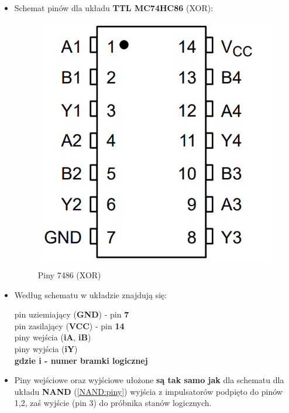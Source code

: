 \begin{itemize}
    \item Schemat pinów dla układu \textbf{TTL MC74HC86} (XOR):
        \begin{figure}[H]
            \centering
            \includegraphics[scale=0.25]{img/schemes/XOR_mc74hc86_pins.png}
            \caption{Piny 7486 (XOR)}
            \label{XOR:piny}
        \end{figure}
    \item Według schematu w układzie znajdują się: 
        \begin{center}
            pin uziemiający (\textbf{GND}) - pin \textbf{7} \\
            pin zasilający (\textbf{VCC}) - pin \textbf{14} \\
            piny wejścia (\textbf{iA}, \textbf{iB}) \\
            piny wyjścia (\textbf{iY}) \\
            \textbf{gdzie i - numer bramki logicznej}
        \end{center}
    \item Piny wejściowe oraz wyjściowe ułożone \textbf{są tak samo jak} dla schematu dla układu \textbf{NAND} (\ref{NAND:piny}) wyjścia z impulsatorów podpięto do pinów 1,2, zaś wyjście (pin 3) do próbnika stanów logicznych.

\end{itemize}
